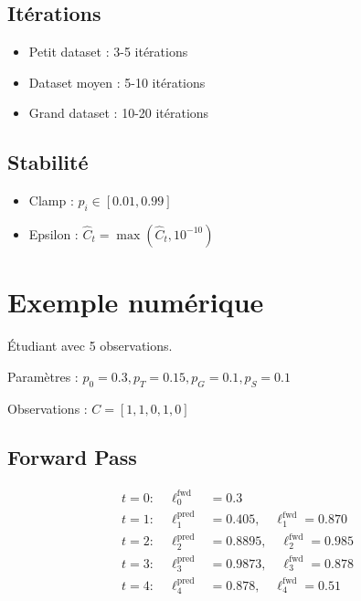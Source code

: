\documentclass[12pt]{article}
\begin{document}
\subsection{Itérations}

\begin{itemize}
    \item Petit dataset : 3-5 itérations
    \item Dataset moyen : 5-10 itérations
    \item Grand dataset : 10-20 itérations
\end{itemize}

\subsection{Stabilité}

\begin{itemize}
    \item Clamp : $p_i \in [0.01, 0.99]$
    \item Epsilon : $\hat{C}_t = \max(\hat{C}_t, 10^{-10})$
\end{itemize}

\newpage

\section{Exemple numérique}

Étudiant avec 5 observations.

Paramètres : $p_0=0.3, p_T=0.15, p_G=0.1, p_S=0.1$

Observations : $C = [1, 1, 0, 1, 0]$

\subsection{Forward Pass}

\begin{align}
    t=0: \quad \ell_0^{\text{fwd}}  & = 0.3                                       \\
    t=1: \quad \ell_1^{\text{pred}} & = 0.405, \quad \ell_1^{\text{fwd}} = 0.870  \\
    t=2: \quad \ell_2^{\text{pred}} & = 0.8895, \quad \ell_2^{\text{fwd}} = 0.985 \\
    t=3: \quad \ell_3^{\text{pred}} & = 0.9873, \quad \ell_3^{\text{fwd}} = 0.878 \\
    t=4: \quad \ell_4^{\text{pred}} & = 0.878, \quad \ell_4^{\text{fwd}} = 0.51
\end{align}
\end{document}
